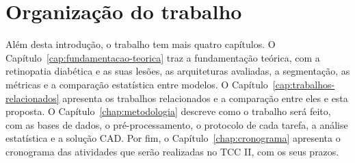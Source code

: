 \section{Organização do trabalho}
\label{sec:organizacao}

Além desta introdução, o trabalho tem mais quatro capítulos. O Capítulo~\ref{cap:fundamentacao-teorica} traz a fundamentação teórica, com a retinopatia diabética e as suas lesões, as arquiteturas avaliadas, a segmentação, as métricas e a comparação estatística entre modelos. O Capítulo~\ref{cap:trabalhos-relacionados} apresenta os trabalhos relacionados e a comparação entre eles e esta proposta. O Capítulo~\ref{chap:metodologia} descreve como o trabalho será feito, com as bases de dados, o pré-processamento, o protocolo de cada tarefa, a análise estatística e a solução CAD. Por fim, o Capítulo~\ref{chap:cronograma} apresenta o cronograma das atividades que serão realizadas no TCC II, com os seus prazos.
